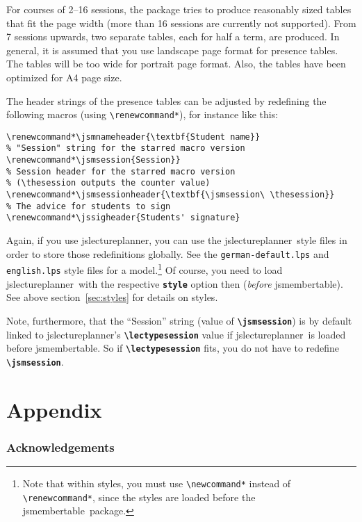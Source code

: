 \documentclass[english]{article}
\newcommand*\jmacro[1]{\textbf{\texttt{#1}}}
\newcommand*\jcsmacro[1]{\jmacro{\textbackslash{#1}}}
\newcommand*\joption[1]{\textbf{\texttt{#1}}}
\newcommand*\jfmacro[1]{\texttt{#1}}
\newcommand*\jfcsmacro[1]{\jfmacro{\textbackslash{#1}}}
\newcommand*\jslp{\textsf{jslectureplanner}}
\newcommand*\jsmt{\textsf{jsmembertable}}
\begin{document}
For courses of 2--16 sessions, the package tries to produce reasonably sized tables that
fit the page width (more than 16 sessions are currently not supported).
From 7 sessions upwards, two separate tables, each for half a term,
are produced. In general, it is assumed that you use landscape page format for presence tables.
The tables will be too wide for portrait page format. Also, the tables have been optimized for A4
page size.

The header strings of the presence tables can be adjusted by redefining the following
macros (using \jfcsmacro{renewcommand*}), for instance like this:
\begin{lstlisting}[language={[LaTeX]TeX},basicstyle={\small\ttfamily},frame=single]
% Student Name
\renewcommand*\jsmnameheader{\textbf{Student name}}
% "Session" string for the starred macro version
\renewcommand*\jsmsession{Session}}
% Session header for the starred macro version
% (\thesession outputs the counter value)
\renewcommand*\jsmsessionheader{\textbf{\jsmsession\ \thesession}}
% The advice for students to sign
\renewcommand*\jssigheader{Students' signature}
\end{lstlisting}
Again, if you use \jslp, you can use the \jslp\
style files in order to store those redefinitions globally.
See the \texttt{german-default.lps} and \texttt{english.lps} style files for a model.\footnote{%
Note that within styles, you must use \jfcsmacro{newcommand*} instead of
\jfcsmacro{renewcommand*}, since the styles are loaded before the \jsmt\ package.}
Of course, you need to load \jslp\ with the respective \joption{style} option then
(\emph{before} \jsmt).
See above section~\ref{sec:styles} for details on styles.

Note, furthermore, that the ``Session'' string (value of \jcsmacro{jsmsession}) is by default
linked to \jslp's \jcsmacro{lectypesession} value if 
\jslp\ is loaded before \jsmt. So if \jcsmacro{lectypesession} fits, you do not have to redefine
\jcsmacro{jsmsession}.


\clearpage

\appendix

\part{Appendix}

\section{Acknowledgements}
\end{document}
